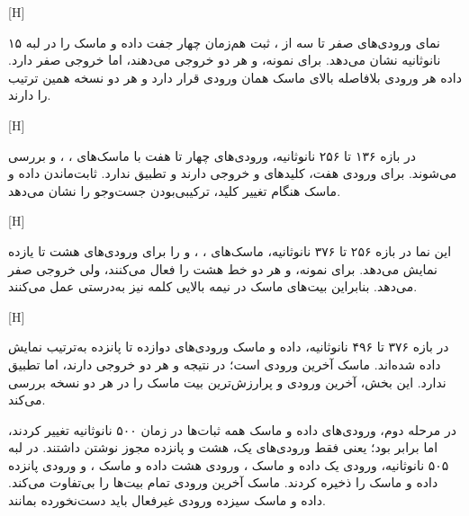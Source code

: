 [H]

نمای ورودی‌های صفر تا سه از ، ثبت هم‌زمان چهار جفت داده و ماسک را در لبه ۱۵ نانوثانیه نشان می‌دهد. برای نمونه،  و  هر دو خروجی  می‌دهند، اما  خروجی صفر دارد. داده هر ورودی بلافاصله بالای ماسک همان ورودی قرار دارد و هر دو نسخه همین ترتیب را دارند.

[H]

در بازه ۱۳۶ تا ۲۵۶ نانوثانیه، ورودی‌های چهار تا هفت با ماسک‌های ، ،  و  بررسی می‌شوند. برای ورودی هفت، کلیدهای  و  خروجی  دارند و  تطبیق ندارد. ثابت‌ماندن داده و ماسک هنگام تغییر کلید، ترکیبی‌بودن جست‌وجو را نشان می‌دهد.

[H]

این نما در بازه ۲۵۶ تا ۳۷۶ نانوثانیه، ماسک‌های ، ،  و  را برای ورودی‌های هشت تا یازده نمایش می‌دهد. برای نمونه،  و  هر دو خط هشت را فعال می‌کنند، ولی  خروجی صفر می‌دهد. بنابراین بیت‌های ماسک در نیمه بالایی کلمه نیز به‌درستی عمل می‌کنند.

[H]

در بازه ۳۷۶ تا ۴۹۶ نانوثانیه، داده و ماسک ورودی‌های دوازده تا پانزده به‌ترتیب نمایش داده شده‌اند. ماسک آخرین ورودی  است؛ در نتیجه  و  هر دو خروجی  دارند، اما  تطبیق ندارد. این بخش، آخرین ورودی و پرارزش‌ترین بیت ماسک را در هر دو نسخه بررسی می‌کند.

در مرحله دوم، ورودی‌های داده و ماسک همه ثبات‌ها در زمان ۵۰۰ نانوثانیه تغییر کردند، اما  برابر  بود؛ یعنی فقط ورودی‌های یک، هشت و پانزده مجوز نوشتن داشتند. در لبه ۵۰۵ نانوثانیه، ورودی یک داده  و ماسک ، ورودی هشت داده  و ماسک ، و ورودی پانزده داده  و ماسک  را ذخیره کردند. ماسک آخرین ورودی تمام بیت‌ها را بی‌تفاوت می‌کند. داده و ماسک سیزده ورودی غیرفعال باید دست‌نخورده بمانند.

